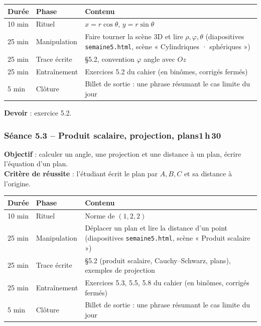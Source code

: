 \documentclass[10.5pt,a4paper]{article}
\newif\ifprof
\newcommand{\profonly}[1]{\ifprof #1\fi}
\begin{document}
\begin{longtable}{@{}p{1.1cm}p{2.4cm}p{12.4cm}@{}}
\toprule \textbf{Durée} & \textbf{Phase} & \textbf{Contenu}\\ \midrule\endhead
10 min & Rituel & $x=r\cos\theta$, $y=r\sin\theta$\\
25 min & Manipulation & Faire tourner la scène 3D et lire $\rho,\varphi,\theta$ (diapositives \texttt{semaine5.html}, scène « Cylindriques · sphériques »)\\
25 min & Trace écrite & \S5.2, convention $\varphi$ angle avec $Oz$\\
25 min & Entraînement & Exercices 5.2 du cahier (en binômes, corrigés fermés)\\
5 min & Clôture & Billet de sortie : une phrase résumant le cas limite du jour\\ \bottomrule\end{longtable}\nopagebreak
\textbf{Devoir} : exercice 5.2.\profonly{ \textbf{Point de vigilance} : Annoncer la convention sur $\theta$ et $\varphi$ dès le début.}\par
{}\subsubsection*{\textcolor{marine}{Séance 5.3 -- Produit scalaire, projection, plans}\hfill\normalfont\small\textcolor{ardoise}{1\,h\,30}}
\begin{objectif}\textbf{Objectif} : calculer un angle, une projection et une distance à un plan, écrire l'équation d'un plan.\\\textbf{Critère de réussite} : l'étudiant écrit le plan par $A,B,C$ et sa distance à l'origine.\end{objectif}\nopagebreak
\begin{longtable}{@{}p{1.1cm}p{2.4cm}p{12.4cm}@{}}
\toprule \textbf{Durée} & \textbf{Phase} & \textbf{Contenu}\\ \midrule\endhead
10 min & Rituel & Norme de $(1,2,2)$\\
25 min & Manipulation & Déplacer un plan et lire la distance d'un point (diapositives \texttt{semaine5.html}, scène « Produit scalaire »)\\
25 min & Trace écrite & \S5.2 (produit scalaire, Cauchy--Schwarz, plans), exemples de projection\\
25 min & Entraînement & Exercices 5.3, 5.5, 5.8 du cahier (en binômes, corrigés fermés)\\
5 min & Clôture & Billet de sortie : une phrase résumant le cas limite du jour\\ \bottomrule\end{longtable}\nopagebreak
\end{document}
